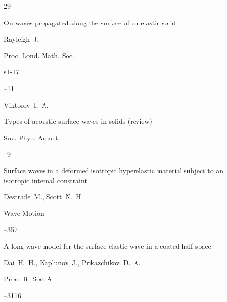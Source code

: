 \begin{thebibliography}{29}




\paper On waves propagated along the surface of an elastic solid

\by Rayleigh~J.

\jour Proc. Lond. Math. Soc. 


\vol s1-17


--11





\by Viktorov~I.~A.


\paper Types of acoustic surface waves in solids (review)

\jour Sov. Phys. Acoust. 



–9




\paper Surface waves in a deformed isotropic hyperelastic material subject to an isotropic internal constraint

\by Destrade~M., Scott~N.~H.

\jour Wave Motion




–357





\paper A long-wave model for the surface elastic wave in a coated half-space

\by Dai~H.~H., Kaplunov~J., Prikazchikov~D.~A.

\jour Proc.~R. Soc. A



–3116





\end{thebibliography}
